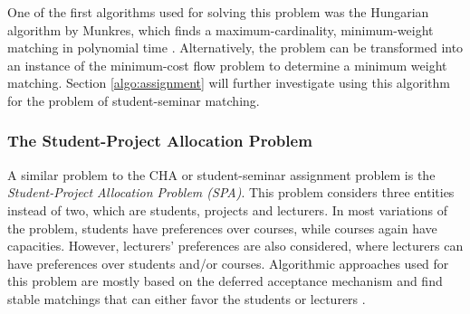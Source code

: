 One of the first algorithms used for solving this problem was the Hungarian algorithm by Munkres, which finds a maximum-cardinality, minimum-weight matching in polynomial time \cite{Munkres}. 
Alternatively, the problem can be transformed into an instance of the minimum-cost flow problem to determine a minimum weight matching. Section \ref{algo:assignment} will further investigate using this algorithm for the problem of student-seminar matching.

\subsubsection{The Student-Project Allocation Problem}
A similar problem to the CHA or student-seminar assignment problem is the \emph{Student-Project Allocation Problem (SPA)}. This problem considers three entities instead of two, which are students, projects and lecturers. In most variations of the problem, students have preferences over courses, while courses again have capacities. However, lecturers' preferences are also considered, where lecturers can have preferences over students and/or courses. Algorithmic approaches used for this problem are mostly based on the deferred acceptance mechanism and find stable matchings that can either favor the students or lecturers \cite{algorithmics}. 